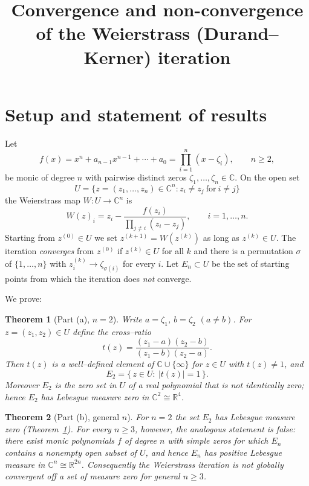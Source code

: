 \documentclass{amsart}
\newtheorem{theorem}{Theorem}
\theoremstyle{definition}
\theoremstyle{remark}
\newcommand{\C}{\mathbb{C}}
\newcommand{\R}{\mathbb{R}}
\begin{document}
\title{Convergence and non-convergence of the Weierstrass (Durand--Kerner) iteration}
\maketitle

\section{Setup and statement of results}

Let
\[
f(x)=x^n+a_{n-1}x^{n-1}+\cdots+a_0
=\prod_{i=1}^n (x-\zeta_i),\qquad n\ge 2,
\]
be monic of degree $n$ with pairwise distinct zeros $\zeta_1,\dots,\zeta_n\in\C$.
On the open set
\[
U=\{z=(z_1,\dots,z_n)\in\C^n : z_i\neq z_j\ \text{for}\ i\neq j\}
\]
the Weierstrass map $W:U\to\C^n$ is
\[
W(z)_i=z_i-\frac{f(z_i)}{\prod_{j\neq i}(z_i-z_j)},\qquad i=1,\dots,n .
\]
Starting from $z^{(0)}\in U$ we set $z^{(k+1)}=W(z^{(k)})$ as long as $z^{(k)}\in U$.
The iteration \emph{converges} from $z^{(0)}$ if $z^{(k)}\in U$ for all $k$ and there is a
permutation $\sigma$ of $\{1,\dots,n\}$ with $z^{(k)}_i\to\zeta_{\sigma(i)}$ for every $i$.
Let $E_n\subset U$ be the set of starting points from which the iteration does \emph{not}
converge.

We prove:

\begin{theorem}[Part (a), $n=2$]\label{thm:a}
Write $a=\zeta_1$, $b=\zeta_2$ $(a\neq b)$. For $z=(z_1,z_2)\in U$ define the cross--ratio
\begin{equation}\label{eq:cr}
t(z)=\frac{(z_1-a)(z_2-b)}{(z_1-b)(z_2-a)} .
\end{equation}
Then $t(z)$ is a well--defined element of $\C\cup\{\infty\}$ for $z\in U$ with $t(z)\neq 1$,
and
\[
E_2=\{\,z\in U:\ |t(z)|=1\,\}.
\]
Moreover $E_2$ is the zero set in $U$ of a real polynomial that is not identically zero;
hence $E_2$ has Lebesgue measure zero in $\C^2\cong\R^4$.
\end{theorem}

\begin{theorem}[Part (b), general $n$]\label{thm:b}
For $n=2$ the set $E_2$ has Lebesgue measure zero (Theorem~\ref{thm:a}).
For every $n\ge 3$, however, the analogous statement is false: there exist monic
polynomials $f$ of degree $n$ with simple zeros for which $E_n$ contains a nonempty open
subset of $U$, and hence $E_n$ has positive Lebesgue measure in $\C^n\cong\R^{2n}$.
Consequently the Weierstrass iteration is \emph{not} globally convergent off a set of
measure zero for general $n\ge 3$.
\end{theorem}
\end{document}
